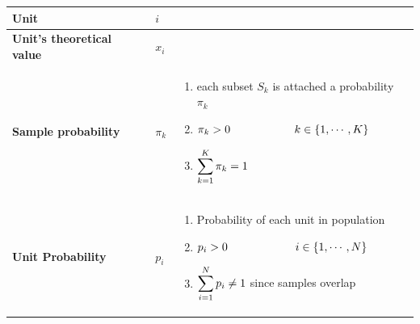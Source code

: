 \begin{customArrayStretch}{1.3}
\begin{longtable}{>{\RaggedRight\arraybackslash}p{4cm} >{\centering\arraybackslash}p{0.5cm} p{10.5cm}}
\textbf{Unit} &
    $i$ &
    \hfill \cite{statistics/book/Statistics-for-Data-Scientists/Maurits-Kaptein}
    \\ \hline

\textbf{Unit's  theoretical value} &
    $x_i$ &
    \hfill \cite{statistics/book/Statistics-for-Data-Scientists/Maurits-Kaptein}
    \\ \hline

\textbf{Sample probability} &
    $\pi_k$ &
    \begin{minipage}{10.3cm}
        \vspace{0.15cm}
        \begin{enumerate}[itemsep=0.2cm]
            \item each subset $S_k$ is attached a probability $\pi_k$
            \hfill \cite{statistics/book/Statistics-for-Data-Scientists/Maurits-Kaptein}
            
            \item $\pi_k > 0 \hspace{2cm}  k \in \left\{1,\cdots,K\right\}$
            \hfill \cite{statistics/book/Statistics-for-Data-Scientists/Maurits-Kaptein}
            
            \item $\displaystyle\sum_{k=1}^K \pi_k = 1$
            \hfill \cite{statistics/book/Statistics-for-Data-Scientists/Maurits-Kaptein}
        \end{enumerate}
        \vspace{0.15cm}
    \end{minipage} 
    \\ \hline


\textbf{Unit Probability} &
    $p_i$ &
    \begin{minipage}{10.3cm}
        \vspace{0.15cm}
        \begin{enumerate}[itemsep=0.2cm]
            \item Probability of each unit in population
            \hfill \cite{statistics/book/Statistics-for-Data-Scientists/Maurits-Kaptein}
            
            \item $p_i > 0 \hspace{2cm} \ i \in \left\{1,\cdots,N\right\}$
            \hfill \cite{statistics/book/Statistics-for-Data-Scientists/Maurits-Kaptein}

            \item $\displaystyle\sum_{i=1}^N p_i \neq 1$ since samples overlap
            \hfill \cite{statistics/book/Statistics-for-Data-Scientists/Maurits-Kaptein}


\end{enumerate}
\end{minipage}
\end{longtable}
\end{customArrayStretch}
